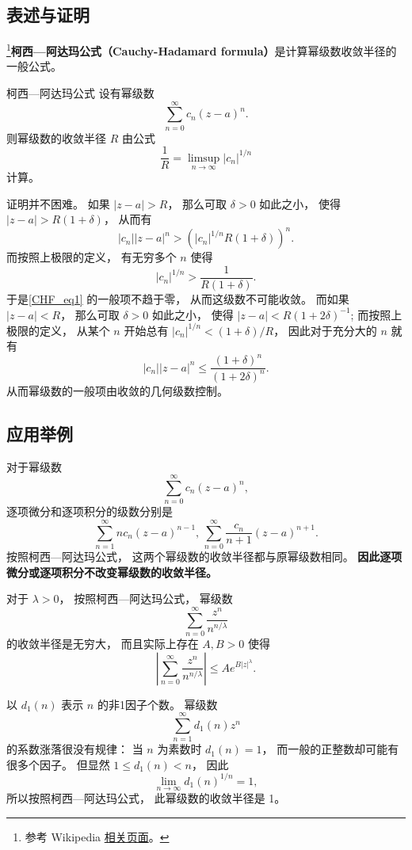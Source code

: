 

\subsection{表述与证明}

\footnote{参考 Wikipedia \href{https://en.wikipedia.org/wiki/Cauchy-Hadamard_theorem}{相关页面}。}\textbf{柯西—阿达玛公式（Cauchy-Hadamard formula）}是计算幂级数收敛半径的一般公式。

\begin{theorem}{柯西—阿达玛公式}
设有幂级数
\begin{equation}\label{CHF_eq1}
\sum_{n=0}^\infty c_n(z-a)^n.
\end{equation}
则幂级数的收敛半径 $R$ 由公式
$$
\frac{1}{R}=\limsup_{n\to\infty}|c_n|^{1/n}
$$
计算。
\end{theorem}
证明并不困难。 如果 $|z-a|>R$， 那么可取 $\delta>0$ 如此之小， 使得 $|z-a|>R(1+\delta)$， 从而有
$$
|c_n||z-a|^n>(|c_n|^{1/n}R(1+\delta))^n.
$$
而按照上极限的定义， 有无穷多个 $n$ 使得
$$
|c_n|^{1/n}>\frac{1}{R(1+\delta)}.
$$
于是\autoref{CHF_eq1} 的一般项不趋于零， 从而这级数不可能收敛。 而如果 $|z-a|<R$， 那么可取 $\delta>0$ 如此之小， 使得 $|z-a|<R(1+2\delta)^{-1}$; 而按照上极限的定义， 从某个 $n$ 开始总有 $|c_n|^{1/n}<(1+\delta)/R$， 因此对于充分大的 $n$ 就有
$$
|c_n||z-a|^n\leq\frac{(1+\delta)^n}{(1+2\delta)^n}.
$$
从而幂级数的一般项由收敛的几何级数控制。

\subsection{应用举例}
对于幂级数
$$
\sum_{n=0}^\infty c_n(z-a)^n,
$$
逐项微分和逐项积分的级数分别是
$$
\sum_{n=1}^\infty nc_n(z-a)^{n-1},\,
\sum_{n=0}^\infty \frac{c_n}{n+1}(z-a)^{n+1}.
$$
按照柯西—阿达玛公式， 这两个幂级数的收敛半径都与原幂级数相同。 \textbf{因此逐项微分或逐项积分不改变幂级数的收敛半径。}

对于 $\lambda>0$， 按照柯西—阿达玛公式， 幂级数
$$
\sum_{n=0}^\infty\frac{z^n}{n^{n/\lambda}}
$$
的收敛半径是无穷大， 而且实际上存在 $A,B>0$ 使得
$$
\left|\sum_{n=0}^\infty\frac{z^n}{n^{n/\lambda}}\right|
\leq Ae^{B|z|^\lambda}.
$$

以 $d_1(n)$ 表示 $n$ 的非1因子个数。 幂级数
$$
\sum_{n=1}^\infty d_1(n)z^n
$$
的系数涨落很没有规律： 当 $n$ 为素数时 $d_1(n)=1$， 而一般的正整数却可能有很多个因子。 但显然 $1\leq d_1(n)<n$， 因此
$$
\lim_{n\to\infty}d_1(n)^{1/n}=1,
$$
所以按照柯西—阿达玛公式， 此幂级数的收敛半径是 1。